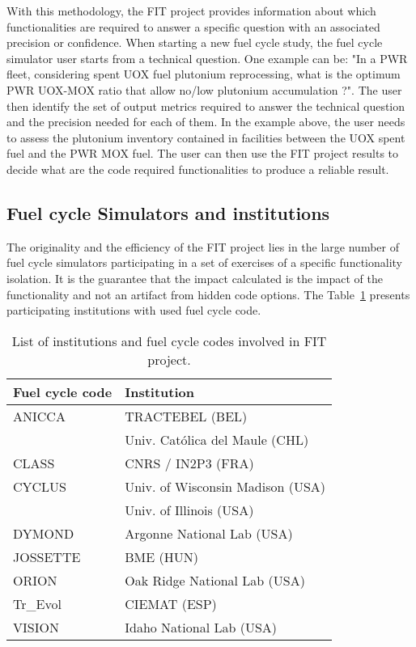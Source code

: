 With this methodology, the FIT project provides information about which functionalities are required to answer a specific question with an associated precision or confidence.
When starting a new fuel cycle study, the fuel cycle simulator user starts from a technical question.
One example can be: "In a \gls{PWR} fleet, considering spent \gls{UOX} fuel plutonium reprocessing, what is the optimum \gls{PWR} \gls{UOX}-\gls{MOX} ratio that allow no/low plutonium accumulation ?".
The user then identify the set of output metrics required to answer the technical question and the precision needed for each of them.
In the example above, the user needs to assess the plutonium inventory contained in facilities between the \gls{UOX} spent fuel and the \gls{PWR} \gls{MOX} fuel.
The user can then use the FIT project results to decide what are the code required functionalities to produce a reliable result.


\subsection{Fuel cycle Simulators and institutions}

The originality and the efficiency of the FIT project lies in the large number of fuel cycle simulators participating in a set of exercises of a specific functionality isolation. It is the guarantee that the impact calculated is the impact of the functionality and not an artifact from hidden code options. The Table~\ref{Tab:Code} presents participating institutions with used fuel cycle code.

\begin{table}[h]
\centering
\begin{tabular}{ |l|l| }
  \hline
  Fuel cycle code & Institution \\
  \hline
  ANICCA\cite{} & TRACTEBEL (BEL) \\
   & Univ. Católica del Maule (CHL) \\
  \hline
  CLASS\cite{Thiolliere_2018} & CNRS / IN2P3 (FRA) \\
  \hline
  CYCLUS\cite{} & Univ. of Wisconsin Madison (USA) \\
  & Univ. of Illinois (USA) \\
  \hline
  DYMOND\cite{} & Argonne National Lab (USA) \\
  \hline
  JOSSETTE\cite{} & BME (HUN) \\
  \hline
  ORION\cite{} & Oak Ridge National Lab (USA) \\
  \hline
  Tr\_Evol\cite{} & CIEMAT (ESP) \\
  \hline
  VISION\cite{jacobson2009vision} & Idaho National Lab (USA) \\
  \hline
\end{tabular}
\label{Tab:Code}
\caption{List of institutions and fuel cycle codes involved in FIT project.}
\end{table}

